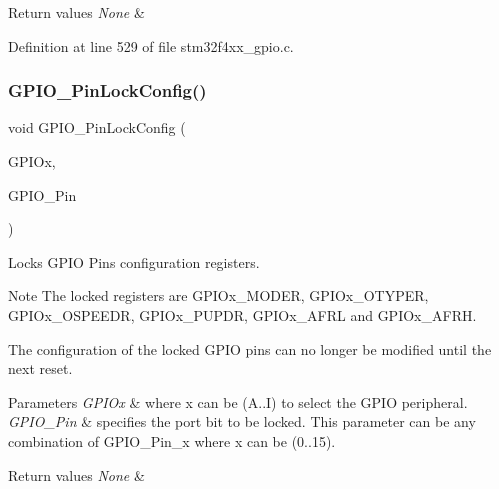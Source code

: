 \begin{DoxyRetVals}{Return values}
{\em None} & \\
\hline
\end{DoxyRetVals}


Definition at line 529 of file stm32f4xx\+\_\+gpio.\+c.

\mbox{\label{group___g_p_i_o_gad2f2e615928c69fd0d8c641a7cedaafc}} 
\subsubsection{\texorpdfstring{G\+P\+I\+O\+\_\+\+Pin\+Lock\+Config()}{GPIO\_PinLockConfig()}}
{\footnotesize\ttfamily void G\+P\+I\+O\+\_\+\+Pin\+Lock\+Config (\begin{DoxyParamCaption}\item[{\hyperlink{struct_g_p_i_o___type_def}{G\+P\+I\+O\+\_\+\+Type\+Def} $\ast$}]{G\+P\+I\+Ox,  }\item[{uint16\+\_\+t}]{G\+P\+I\+O\+\_\+\+Pin }\end{DoxyParamCaption})}



Locks G\+P\+IO Pins configuration registers. 

\begin{DoxyNote}{Note}
The locked registers are G\+P\+I\+Ox\+\_\+\+M\+O\+D\+ER, G\+P\+I\+Ox\+\_\+\+O\+T\+Y\+P\+ER, G\+P\+I\+Ox\+\_\+\+O\+S\+P\+E\+E\+DR, G\+P\+I\+Ox\+\_\+\+P\+U\+P\+DR, G\+P\+I\+Ox\+\_\+\+A\+F\+RL and G\+P\+I\+Ox\+\_\+\+A\+F\+RH. 

The configuration of the locked G\+P\+IO pins can no longer be modified until the next reset. 
\end{DoxyNote}

\begin{DoxyParams}{Parameters}
{\em G\+P\+I\+Ox} & where x can be (A..I) to select the G\+P\+IO peripheral. \\
\hline
{\em G\+P\+I\+O\+\_\+\+Pin} & specifies the port bit to be locked. This parameter can be any combination of G\+P\+I\+O\+\_\+\+Pin\+\_\+x where x can be (0..15). \\
\hline
\end{DoxyParams}

\begin{DoxyRetVals}{Return values}
{\em None} & \\
\hline
\end{DoxyRetVals}


